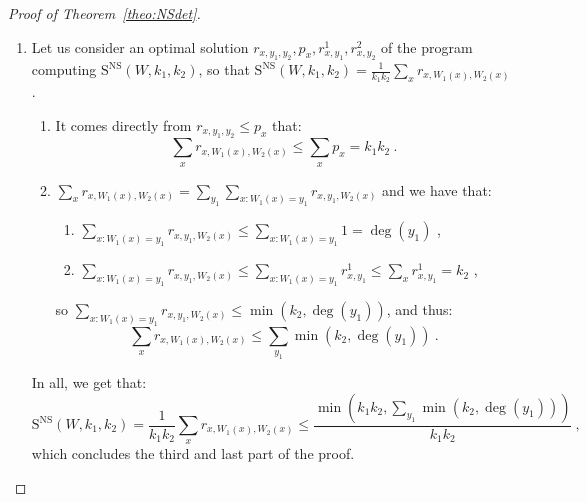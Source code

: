 \begin{proof}[Proof of Theorem~\ref{theo:NSdet}]
\begin{enumerate}
since $\alpha_{\varphi} = 1 - \frac{k_1^{k_1}e^{-k_1}}{k_1!}$.

Finally, $\mathbb{E}\left[\sum_{i_2=1}^{\ell_2}\min\left(k_1,\deg_{\mathcal{Y}_1,\mathcal{P}_2}(\mathcal{P}_2^{i_2})\right)\right] = \sum_{i_2=1}^{\ell_2}\mathbb{E}\left[\varphi(\deg_{\mathcal{Y}_1,\mathcal{P}_2}(\mathcal{P}_2^{i_2}))\right]$, so we get that:
\[ \mathbb{E}\left[\sum_{i_2=1}^{\ell_2}\min\left(k_1,\deg_{\mathcal{Y}_1,\mathcal{P}_2}(\mathcal{P}_2^{i_2})\right)\right] \]
is larger than or equal to:
\[ \frac{\ell_2}{k_2}\left(1 - \frac{k_1^{k_1}e^{-k_1}}{k_1!}\right)\left(1-\left(1-\frac{1}{\ell_2}\right)^{k_2}\right)\min\left(k_1k_2,\sum_{y_1}\min\left(k_2,\deg(y_1)\right)\right) \ . \]

Thus, in particular, there exists some partition $\mathcal{P}_2$ that satisfies the same inequality, which concludes the second part of the proof.

\item Let us consider an optimal solution $r_{x,y_1,y_2},p_x,r^1_{x,y_1},r^2_{x,y_2}$ of the program computing $\mathrm{S}^{\textrm{NS}}(W,k_1,k_2)$, so that $\mathrm{S}^{\textrm{NS}}(W,k_1,k_2) = \frac{1}{k_1k_2}\sum_x r_{x,W_1(x),W_2(x)}$.
  \begin{enumerate}
  \item It comes directly from $r_{x,y_1,y_2} \leq p_x$ that:
    \[ \sum_x r_{x,W_1(x),W_2(x)} \leq \sum_x p_x = k_1k_2 \ . \]
  \item $\sum_x r_{x,W_1(x),W_2(x)} = \sum_{y_1}\sum_{x:W_1(x)=y_1} r_{x,y_1,W_2(x)}$ and we have that:
    \begin{enumerate}
    \item $\sum_{x:W_1(x)=y_1} r_{x,y_1,W_2(x)} \leq \sum_{x:W_1(x)=y_1} 1 = \deg(y_1)$ ,
    \item $\sum_{x:W_1(x)=y_1} r_{x,y_1,W_2(x)} \leq \sum_{x:W_1(x)=y_1} r^1_{x,y_1} \leq \sum_x r^1_{x,y_1} = k_2$ ,
    \end{enumerate}
    so $\sum_{x:W_1(x)=y_1} r_{x,y_1,W_2(x)} \leq \min(k_2,\deg(y_1))$, and thus:
    \[ \sum_x r_{x,W_1(x),W_2(x)} \leq \sum_{y_1}\min(k_2,\deg(y_1)) \ .\]
  \end{enumerate}

  In all, we get that:
  \[ \mathrm{S}^{\textrm{NS}}(W,k_1,k_2) = \frac{1}{k_1k_2}\sum_x r_{x,W_1(x),W_2(x)} \leq \frac{\min\left(k_1k_2,\sum_{y_1}\min(k_2,\deg(y_1))\right)}{k_1k_2} \ , \]
  which concludes the third and last part of the proof.
  \end{enumerate}
\end{proof}

